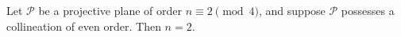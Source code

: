 Let $\mathcal{P}$ be a projective plane of order $n \equiv 2 \pmod{4}$, and suppose $\mathcal{P}$ possesses a collineation of even order. Then $n = 2$.
